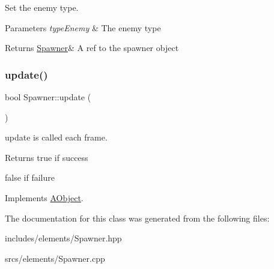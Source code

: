 Set the enemy type. 


\begin{DoxyParams}{Parameters}
{\em type\+Enemy} & The enemy type \\
\hline
\end{DoxyParams}
\begin{DoxyReturn}{Returns}
\hyperlink{class_spawner}{Spawner}\& A ref to the spawner object 
\end{DoxyReturn}
\mbox{\label{class_spawner_a9325e76299405d5d74abfb72f4ea2380}} 
\subsubsection{\texorpdfstring{update()}{update()}}
{\footnotesize\ttfamily bool Spawner\+::update (\begin{DoxyParamCaption}{ }\end{DoxyParamCaption})\hspace{0.3cm}{\ttfamily [virtual]}}



update is called each frame. 

\begin{DoxyReturn}{Returns}
true if success 

false if failure 
\end{DoxyReturn}


Implements \hyperlink{class_a_object_af35bb4b68af0a11bb1fcf617bde41ecd}{A\+Object}.



The documentation for this class was generated from the following files\+:\begin{DoxyCompactItemize}
\item 
includes/elements/Spawner.\+hpp\item 
srcs/elements/Spawner.\+cpp\end{DoxyCompactItemize}
